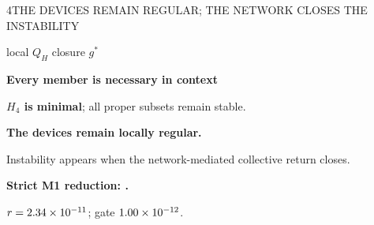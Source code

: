 {\begin{minipage}[t][\PosterFourHeight][t]{\PosterGridWidth}
\begin{PosterPanel}{\PosterFourHeight}{4}{THE DEVICES REMAIN REGULAR; THE NETWORK CLOSES THE INSTABILITY}
\begin{minipage}[t]{236mm}
\par
      {\FigureSize\StableMark\; local\quad
       \UnstableMark\; $Q_H$ closure\quad
       \BoundaryMark\; $g^*$\par}
    \end{minipage}\hspace{3mm}%
    \begin{minipage}[t]{145mm}\vspace{0pt}
      \colorbox{IASPaleGold}{\parbox[c][60mm][c]{\dimexpr\linewidth-2\fboxsep\relax}{\centering
        {\PosterCondensed\bfseries\fontsize{29pt}{32pt}\selectfont\color{IASDarkGreen}Every member is necessary in context\par}
        {\TableSize\color{IASDarkText}\textbf{$H_4$ is minimal}; all proper subsets remain stable.}}}\par
      \vspace{2mm}
      \colorbox{IASPaleGreen}{\parbox[c][50mm][c]{\dimexpr\linewidth-2\fboxsep\relax}{\centering
        {\fontsize{25pt}{27pt}\selectfont\bfseries\color{IASDarkGreen}The devices remain locally regular.\par}
        {\fontsize{25pt}{27pt}\selectfont\color{IASDarkText}Instability appears when the network-mediated collective return closes.}}}\par
      \vspace{2mm}
      {\fontsize{25pt}{27pt}\selectfont\bfseries\color{IASVermillion}Strict M1 reduction: \MOneEvidenceState.\par}
      {\FigureSize\color{IASDarkText}$r=2.34\times10^{-11}$; gate $1.00\times10^{-12}$.\par}
    \end{minipage}
  \end{PosterPanel}
\end{minipage}%
}%
\ifdefined\PosterFull
  \PosterSectionContent
  \let\PosterSectionFinish\relax
\else
  \def\PosterPageWidth{\PosterPreviewFullPageWidth}
  \def\PosterPageHeight{\PosterPreviewFourPageHeight}
  \def\PosterPreviewLeft{\PosterOuterMargin}
  
  \begin{frame}[t]
  \vspace*{\PosterPreviewTop}
  \noindent\hspace*{\PosterPreviewLeft}%
  \PosterSectionContent
  \end{frame}
  \def\PosterSectionFinish{}
\fi
\PosterSectionFinish
